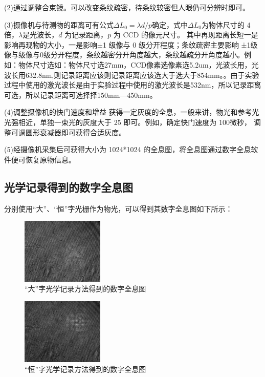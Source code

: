 \documentclass[10pt,a4paper,twocolumn,twoside,UTF8]{ctexart}
\begin{document}
		(2)通过调整合束镜。可以改变条纹疏密，待条纹较密但人眼仍可分辨时即可。

		(3)摄像机与待测物的距离可有公式$\Delta L_0=\lambda d/p$确定，式中$\Delta L_0$为物体尺寸的 4 倍，$\lambda$是光波长，$d$ 为记录距离，$p$ 为 CCD 的像元尺寸。 其中再现距离长短一是影响再现物的大小，一是影响±1 级像与 0 级分开程度；条纹疏密主要影响	±1级像与级像与0级分开程度，条纹越密分开角度越大，条纹越疏分开角度越小。例如：物体尺寸选如：物体尺寸选27mm，CCD像素选像素选5.2um，光波长用，光波长用632.8nm,则记录距离应该则记录距离应该选大于选大于854mm。。由于实验过程中使用的激光波长是由于实验过程中使用的激光波长是532nm，所以记录距离可选，所以记录距离可选择择150mm—450mm。

		(4)调整摄像机的快门速度和增益 获得一定灰度的全息，一般来讲，物光和参考光光强相近，单独一束光的灰度大于 25 即可。例如，确定快门速度为 100微秒， 调整可调圆形衰减器即可获得合适灰度。
		
		(5)经摄像机采集后可获得大小为 1024*1024 的全息图，将全息图通过数字全息软件便可恢复原物信息。

		\subsection{光学记录得到的数字全息图}

		分别使用“大”、“恒”字光栅作为物光，可以得到其数字全息图如下所示：

		\begin{figure}[H]
			\centering
			\includegraphics[width=0.35\textwidth]{img//2.5.3.jpg}
			\caption{“大”字光学记录方法得到的数字全息图}
			\label{holo2}
		\end{figure}
		\begin{figure}[H]
			\centering
			\includegraphics[width=0.35\textwidth]{img//2.4.7.jpg}
			\caption{“恒”字光学记录方法得到的数字全息图}
			\label{holo3}
		\end{figure}
\end{document}
